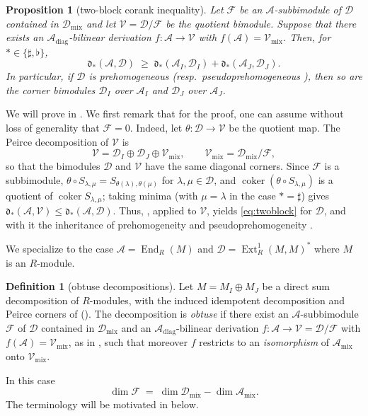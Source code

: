 \documentclass[12pt]{article}
\def\xspace{ }%
\newtheorem{proposition}[proposition]{Proposition}
\theoremstyle{definition}
\newtheorem{definition}[definition]{Definition}
\newcommand{\prigity}{pseudorigidity\xspace}
\newcommand{\obt}{obtuse\xspace}
\newcommand{\pvs}{prehomogeneous\xspace}
\newcommand{\pvsness}{prehomogeneity\xspace}
\newcommand{\wpvs}{pseudo\pvs}
\newcommand{\wpvsness}{pseudo\pvsness}
\newcommand{\mix}{\mathrm{mix}}   %
\newcommand{\diag}{\mathrm{diag}} %
\newcommand{\Ext}{\operatorname{Ext}}
\newcommand{\End}{\operatorname{End}}
\newcommand{\alg}{\mathcal{A}}   %
\newcommand{\bmdl}{\mathcal{D}}   %
\newcommand{\Ff}{\mathcal{F}}   %
\newcommand{\Vv}{\mathcal{V}}   %
\newcommand{\pquo}{\theta}      %
\newcommand{\dfr}{\mathfrak{d}}  %
\newcommand{\Sop}{S}
\newcommand{\rsub}{\sharp}       %
\newcommand{\psub}{\flat}        %
\newcommand{\coker}{\operatorname{coker}}
\begin{document}
\begin{proposition}[two-block corank inequality]\label{prop:twoblock}
Let $\Ff$ be an $\alg$-subbimodule of $\bmdl$ contained in $\bmdl_{\mix}$ and let 
$\Vv = \bmdl/\Ff$ be the quotient bimodule.
Suppose that there exists an $\alg_{\diag}$-bilinear derivation $f : \alg \to \Vv$ with $f(\alg) =\Vv_{\mix}$.
Then, for $\ast\in \{\rsub,\psub\}$,
\begin{equation}\label{eq:twoblock}
   \dfr_\ast(\alg,\bmdl) \;\ge\; \dfr_\ast(\alg_I,\bmdl_I) + \dfr_\ast(\alg_J,\bmdl_J) .
\end{equation}
In particular, if $\bmdl$ is \pvs (resp.\ \wpvs), then so are the corner
bimodules $\bmdl_I$ over $\alg_I$ and $\bmdl_J$ over $\alg_J$.
\end{proposition}



We will prove  in .
We first remark that for the proof, one can assume without loss of generality that $\Ff=0$.
Indeed, let $\pquo : \bmdl \to \Vv$ be the quotient map.
The Peirce decomposition of $\Vv$ is
\[
   \Vv = \bmdl_I \oplus \bmdl_J \oplus \Vv_{\mix}, \qquad \Vv_{\mix} = \bmdl_{\mix}/\Ff,
\]
so that the bimodules $\bmdl$ and $\Vv$ have the same diagonal corners.
Since $\Ff$ is a subbimodule, $\pquo\circ \Sop_{\lambda,\mu} = \Sop_{\pquo(\lambda),\pquo(\mu)}$
for $\lambda,\mu \in \bmdl$, and $\coker(\pquo\circ \Sop_{\lambda,\mu})$ is a quotient of $\coker
\Sop_{\lambda,\mu}$; taking minima (with $\mu =
\lambda$ in the case $\ast = \rsub$) gives $\dfr_\ast(\alg,\Vv) \le
\dfr_\ast(\alg,\bmdl)$. Thus, , applied to
$\Vv$, yields \eqref{eq:twoblock} for $\bmdl$, and with it the inheritance of \pvsness and \wpvsness.


We specialize to the case $\alg =\End_R(M)$ and $\bmdl = \Ext^1_R(M,M)^*$ where $M$ is an $R$-module.

\begin{definition}[\obt decompositions]\label{def:obtuse}
Let $M = M_I \oplus M_J$ be a direct sum decomposition of $R$-modules,
with the induced idempotent decomposition and Peirce corners of
 (). The decomposition is \emph{\obt}
if there exist an $\alg$-subbimodule $\Ff$ of $\bmdl$ contained in
$\bmdl_{\mix}$ and an $\alg_{\diag}$-bilinear derivation
$f : \alg \to \Vv = \bmdl/\Ff$ with $f(\alg) = \Vv_{\mix}$, as in
, such that moreover $f$ restricts to an
\emph{isomorphism} of $\alg_{\mix}$ onto $\Vv_{\mix}$.
\end{definition}
In this case
\begin{equation}\label{eq:dimF}
   \dim \Ff \;=\; \dim \bmdl_{\mix} - \dim\alg_{\mix}.
\end{equation}
The terminology will be motivated in  below.
\end{document}
